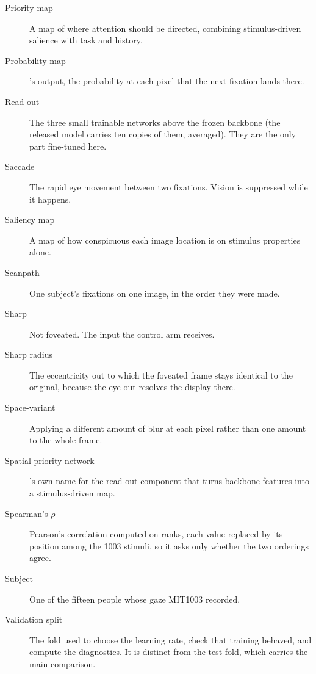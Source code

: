 \begin{description}
\item[Priority map] A map of where attention should be directed, combining stimulus-driven salience with
  task and history.

\item[Probability map] \dg{}'s output, the probability at each pixel that the next fixation lands there.

\item[Read-out] The three small trainable networks above the frozen backbone (the released model carries ten copies of them, averaged). They are the only part
  fine-tuned here.

\item[Saccade] The rapid eye movement between two fixations. Vision is suppressed while it happens.

\item[Saliency map] A map of how conspicuous each image location is on stimulus properties alone.

\item[Scanpath] One subject's fixations on one image, in the order they were made.

\item[Sharp] Not foveated. The input the control arm receives.

\item[Sharp radius] The eccentricity out to which the foveated frame stays identical to the original,
  because the eye out-resolves the display there.

\item[Space-variant] Applying a different amount of blur at each pixel rather than one amount to the
  whole frame.

\item[Spatial priority network] \dg{}'s own name for the read-out component that turns backbone features
  into a stimulus-driven map.

\item[Spearman's $\rho$] Pearson's correlation computed on ranks, each value replaced by its position
  among the 1003 stimuli, so it asks only whether the two orderings agree.

\item[Subject] One of the fifteen people whose gaze MIT1003 recorded.

\item[Validation split] The fold used to choose the learning rate, check that training behaved, and
  compute the diagnostics. It is distinct from the test fold, which carries the main comparison.

\end{description}
